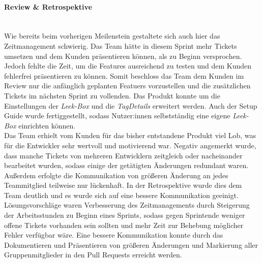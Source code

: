 \documentclass[10pt, a4paper]{article}
\begin{document}
\begin{onehalfspace}
\paragraph*{Review \& Retrospektive} $~$ \\
Wie bereits beim vorherigen Meilenstein gestaltete sich auch hier das Zeitmanagement schwierig.
Das Team hätte in diesem Sprint mehr Tickets umsetzen und dem Kunden präsentieren können, als zu Beginn versprochen. Jedoch fehlte die Zeit, um die Features ausreichend zu testen und dem Kunden fehlerfrei präsentieren zu können.
Somit beschloss das Team dem Kunden im Review nur die anfänglich geplanten Featuers vorzustellen und die zusätzlichen Tickets im nächsten Sprint zu vollenden.
Das Produkt konnte um die Einstellungen der \textit{Leek-Box} und die \textit{TagDetails}  erweitert werden.
Auch der Setup Guide wurde fertiggestellt, sodass Nutzer:innen selbstständig eine eigene \textit{Leek-Box} einrichten können.
\\
Das Team erhielt vom Kunden für das bisher entstandene Produkt viel Lob, was für die Entwickler sehr wertvoll und motivierend war.
Negativ angemerkt wurde, dass manche Tickets von mehreren Entwicklern zeitgleich oder nacheinander bearbeitet wurden, sodass einige der getätigten Änderungen redundant waren.
Außerdem erfolgte die Kommunikation von größeren Änderung an jedes Teammitglied teilweise nur lückenhaft.
In der Retrospektive wurde dies dem Team deutlich und es wurde sich auf eine bessere Kommunikation geeinigt.
Lösungsvorschläge waren Verbesserung des Zeitmanagements durch Steigerung der Arbeitsstunden zu Beginn eines Sprints, sodass gegen Sprintende weniger offene Tickets vorhanden sein sollten und mehr Zeit zur Behebung möglicher Fehler verfügbar wäre.
Eine bessere Kommunikation konnte durch das Dokumentieren und Präsentieren von größeren Änderungen und Markierung aller Gruppenmitglieder in den Pull Requests erreicht werden.


\end{onehalfspace}
\end{document}
